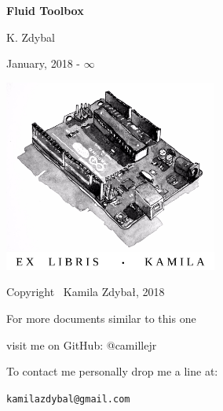 \documentclass[12pt]{article}
\begin{document}
\begin{titlepage}
    \begin{center}

		\vspace*{6cm}
        \LARGE     
		
        \Huge
        \textbf{Fluid Toolbox}
        
        \vspace*{1cm}
        


        \vspace{2cm}
        
        \LARGE
        K. Zdybal

        \vspace{6cm}
		\Large

		\vspace{1cm}

 		January, 2018 - $\infty$
	\end{center}
\end{titlepage}



\thispagestyle{empty}
\begin{center}
    
\vspace*{4cm}

\includegraphics[width = 70mm]{arduino_dwg.jpg}

\vspace*{2cm}

Copyright \textcopyright \, Kamila Zdybał, 2018

For more documents similar to this one 

visit me on GitHub: @camillejr

To contact me personally drop me a line at:

\verb|kamilazdybal@gmail.com|

\end{center}
\newpage
\end{document}
